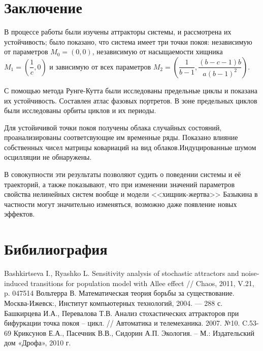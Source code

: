 \documentclass[a4paper,14pt]{extarticle}
\begin{document}
\newpage
\section{Заключение}
В процессе работы были изучены аттракторы системы, и рассмотрена их устойчивость; было показано, что  система имеет три точки покоя: 
независимую от параметров $ M_0 = \left(0,0 \right) $, 
независимую от насыщаемости хищника $ M_1 = \left(\dfrac{1}{c}, 0 \right) $ 
и зависимую от всех параметров $ M_2 = \left(\dfrac{1}{b-1}, \dfrac{(b-c-1)b}{a(b-1)^2} \right) $.

С помощью метода Рунге-Кутта были исследованы предельные циклы и показана их устойчивость.
Составлен атлас фазовых портретов. В зоне предельных циклов были исследованы орбиты циклов и их периоды. 

Для устойичивой точки покоя получены облака случайных состояний, проанализированы соответсвующие им временные ряды.
Показано влияние собственных чисел матрицы ковариаций на вид облаков.Индуцированные шумом осцилляции не обнаружены. 

В совокупности эти результаты позволяют судить о поведении системы и её траекторий, а также показывают, что при изменении значений параметров свойства нелинейных систем вообще и модели <<хищник-жертва>> Базыкина в частности могут значительно изменяться, возможно даже появление новых эффектов.

\newpage
\section{Бибилиография}
\begin{thebibliography}{5}
 Bashkirtseva I., Ryashko L. Sensitivity analysis of stochastic attractors and noise-induced transitions for population model with Allee effect // Chaos, 2011, V.21, p. 047514
Вольтерра В. Математическая теория борьбы за существование. Москва-Ижевск:, Институт компьютерных технологий, 2004. — 288 с.
 Башкирцева И.А., Перевалова Т.В. Анализ стохастических аттракторов при бифуркации точка покоя – цикл. // Автоматика и телемеханика. 2007. №10. C.53-69
 Криксунов Е.А., Пасечник В.В., Сидорин А.П. Экология. – М.: Издательский дом «Дрофа», 2010 г.
\end{thebibliography}
\end{document}
